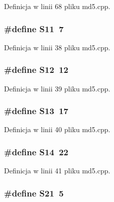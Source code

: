 Definicja w linii 68 pliku md5.cpp.\hypertarget{a00009_51398c0e5541164ad4d6615880073305}{
\subsubsection[{S11}]{\setlength{\rightskip}{0pt plus 5cm}\#define S11~7}}
\label{da/da0/a00009_51398c0e5541164ad4d6615880073305}




Definicja w linii 38 pliku md5.cpp.\hypertarget{a00009_1ec499cd0e54ecc28c2ac2afea5b038e}{
\subsubsection[{S12}]{\setlength{\rightskip}{0pt plus 5cm}\#define S12~12}}
\label{da/da0/a00009_1ec499cd0e54ecc28c2ac2afea5b038e}




Definicja w linii 39 pliku md5.cpp.\hypertarget{a00009_aeec90429105fb54d853dd4fc7027a54}{
\subsubsection[{S13}]{\setlength{\rightskip}{0pt plus 5cm}\#define S13~17}}
\label{da/da0/a00009_aeec90429105fb54d853dd4fc7027a54}




Definicja w linii 40 pliku md5.cpp.\hypertarget{a00009_78342b0ccde2ed12fdf19a113cc266cf}{
\subsubsection[{S14}]{\setlength{\rightskip}{0pt plus 5cm}\#define S14~22}}
\label{da/da0/a00009_78342b0ccde2ed12fdf19a113cc266cf}




Definicja w linii 41 pliku md5.cpp.\hypertarget{a00009_b6d5354f647a0e7592a1f051fc8377b2}{
\subsubsection[{S21}]{\setlength{\rightskip}{0pt plus 5cm}\#define S21~5}}
\label{da/da0/a00009_b6d5354f647a0e7592a1f051fc8377b2}




